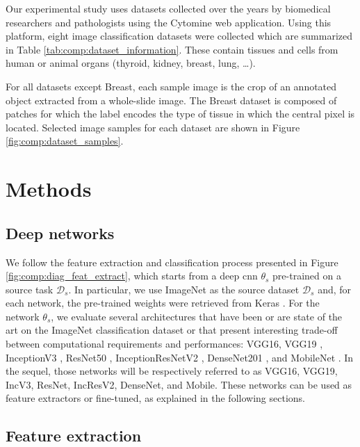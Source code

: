 Our experimental study uses datasets collected over the years by biomedical researchers and pathologists using the Cytomine \parencite{maree2016collaborative} web application. Using this platform, eight image classification datasets were collected which are summarized in Table \ref{tab:comp:dataset_information}. These contain tissues and cells from human or animal organs (thyroid, kidney, breast, lung, \ldots).

For all datasets except Breast, each sample image is the crop of an annotated object extracted from a whole-slide image. The Breast dataset is composed of patches for which the label encodes the type of tissue in which the central pixel is located. Selected image samples for each dataset are shown in Figure \ref{fig:comp:dataset_samples}. 

\section{Methods}
\label{sec:comp:methods}
 
\subsection{Deep networks}
\label{ssec:comp:deep_networks}

We follow the feature extraction and classification process presented in Figure \ref{fig:comp:diag_feat_extract}, which starts from a deep \acrlong{cnn} $\theta_s$ pre-trained on a source task $\mathcal{D}_s$. In particular, we use ImageNet as the source dataset $\mathcal{D}_s$ and, for each network, the pre-trained weights were retrieved from Keras \parencite{chollet2015keras}. For the network $\theta_s$, we evaluate several architectures that have been or are state of the art on the ImageNet classification dataset \parencite{deng2009imagenet} or that present interesting trade-off between computational requirements and performances: VGG16, VGG19 \parencite{simonyan2014very}, InceptionV3 \parencite{szegedy2016rethinking}, ResNet50 \parencite{he2016deep}, InceptionResNetV2 \parencite{szegedy2017inception}, DenseNet201 \parencite{huang2017densely}, and MobileNet \parencite{howard2017mobilenets}. In the sequel, those networks will be respectively referred to as VGG16, VGG19, IncV3, ResNet, IncResV2, DenseNet, and Mobile. These networks can be used as feature extractors or fine-tuned, as explained in the following sections.

\subsection{Feature extraction}
\label{ssec:comp:feature_extr}

